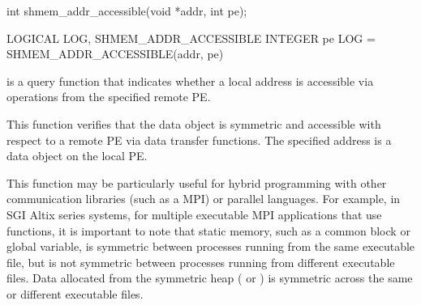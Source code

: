 \synC
int shmem_addr_accessible(void *addr, int pe); %

\synF
LOGICAL LOG, SHMEM_ADDR_ACCESSIBLE
INTEGER pe
LOG = SHMEM_ADDR_ACCESSIBLE(addr, pe) %


{
        is a query function that indicates whether a
       local address is accessible via \openshmem operations from the specified
       remote \ac{PE}. 
       
       This function verifies that the data object is symmetric and accessible
       with respect to a remote \ac{PE} via \openshmem  data  transfer  functions.  The
       specified address  is a data object on the local \ac{PE}. 
       
       \cbstart This function may be particularly useful for hybrid programming \cbend with 
       other communication libraries (such as a \ac{MPI}) or parallel languages. 
       For example, in SGI Altix series systems, for multiple executable MPI applications
       that use \openshmem functions, it is important to note that static memory,
       such as a \Fortran{} common block or \Clang{} global variable, is symmetric
       between processes running from the same executable file, but is not
       symmetric between processes running from different executable files.
       Data allocated from the symmetric heap ( or ) is
       symmetric across the same or different executable files.
}
{
}
\eAPI

